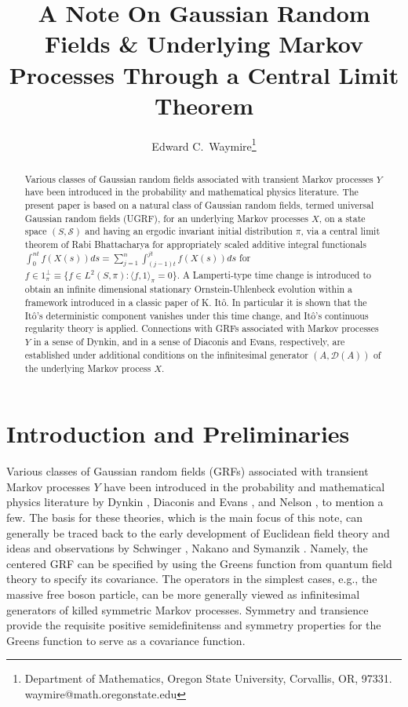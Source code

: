 \documentclass[11pt]{article}
\title{A Note On Gaussian Random Fields \& Underlying Markov Processes
Through a Central Limit Theorem}
\author{Edward C.\ Waymire\thanks{Department of Mathematics,  Oregon State University, Corvallis, OR, 97331. 
{waymire@math.oregonstate.edu}}
}
\numberwithin{equation}{section}
\theoremstyle{definition}
\theoremstyle{remark}
\theoremstyle{definition}
\begin{document}
\maketitle


\begin{abstract} 
Various classes of  
 Gaussian random fields associated with transient Markov processes $Y$
 have been introduced in the  probability and mathematical physics literature.  The present paper is based on a natural
class of Gaussian random fields, termed universal Gaussian random fields
(UGRF),  for an underlying
Markov processes $X$, on a state space $(S,\mathcal{S})$ and having an
ergodic invariant
initial distribution $\pi$,
via a central limit theorem of Rabi Bhattacharya for appropriately 
scaled additive integral functionals
$\int_0^{nt}f(X(s))ds = \sum_{j=1}^n\int_{(j-1)t}^{jt}f(X(s))ds$ for $f\in1_\pi^\perp\equiv \{f\in L^2(S,\pi):\langle f,1\rangle_\pi=0\}$.  A Lamperti-type time change is 
introduced to obtain an infinite dimensional stationary Ornstein-Uhlenbeck evolution within a framework introduced in a classic
paper of K. It\^o. In particular it is shown that the It\^o's 
deterministic component vanishes under this time change, and It\^o's continuous regularity theory is applied. 
Connections with  
 GRFs associated with Markov processes $Y$ in a sense of Dynkin, and in a sense of
 Diaconis and Evans, respectively, are established 
under additional conditions on the infinitesimal generator $(A,\mathcal{D}(A))$
of the underlying Markov process $X$.
 \end{abstract}
\section{Introduction and Preliminaries}
Various classes of  
 Gaussian random fields (GRFs) associated with transient Markov processes $Y$
 have been introduced in the  probability and mathematical physics literature  by Dynkin \cite{Dynkin1, Dynkin2},
 Diaconis and Evans \cite{DiaconisEvans},
and Nelson \cite{Nelson2}, to mention a few. 
The basis for these theories, which is the main focus of this note, 
can generally be traced back to the early development of Euclidean field theory
and ideas and observations by Schwinger \cite{Schwinger},  Nakano \cite{Nakano} and  Symanzik \cite{Symanzik1}.
Namely, the centered GRF can be specified by using the Greens function
from quantum field theory to specify its covariance.  The operators in the
simplest cases, e.g., the massive free boson particle, can be more generally viewed
as infinitesimal generators of  killed symmetric Markov processes. Symmetry
and transience provide the requisite positive semidefinitenss 
and symmetry properties for the Greens function to serve as
a covariance function. 
\end{document}
